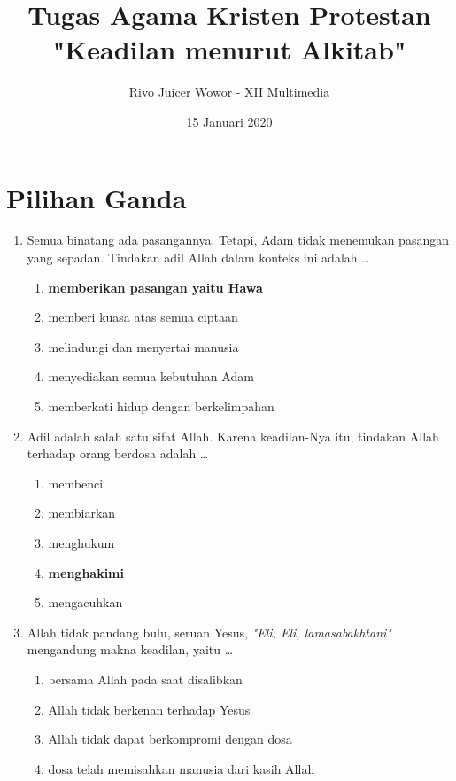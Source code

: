 \documentclass[12pt]{article}
\title{Tugas Agama Kristen Protestan \\ \textbf{"Keadilan menurut Alkitab"}}
\date{15 Januari 2020}
\author{Rivo Juicer Wowor - XII Multimedia}
\begin{document}
    \maketitle
    \section{Pilihan Ganda}
    \begin{enumerate}
        \item Semua binatang ada pasangannya. Tetapi, Adam tidak menemukan pasangan yang sepadan.
            Tindakan adil Allah dalam konteks ini adalah \dots
            \begin{enumerate}
                \item \textbf{memberikan pasangan yaitu Hawa}
                \item memberi kuasa atas semua ciptaan
                \item melindungi dan menyertai manusia
                \item menyediakan semua kebutuhan Adam
                \item memberkati hidup dengan berkelimpahan
            \end{enumerate}
        \item Adil adalah salah satu sifat Allah. Karena keadilan-Nya itu, tindakan Allah 
            terhadap orang berdosa adalah \dots
            \begin{enumerate}
                \item membenci
                \item membiarkan
                \item menghukum
                \item \textbf{menghakimi}
                \item mengacuhkan
            \end{enumerate}
        \item Allah tidak pandang bulu, seruan Yesus, \textit{"Eli, Eli, lamasabakhtani"}
            mengandung makna keadilan, yaitu \dots
            \begin{enumerate}
                \item bersama Allah pada saat disalibkan
                \item Allah tidak berkenan terhadap Yesus
                \item Allah tidak dapat berkompromi dengan dosa 
                \item dosa telah memisahkan manusia dari kasih Allah

\end{enumerate}
\end{enumerate}
\end{document}
